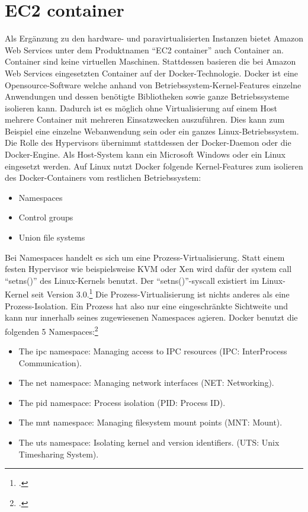 \documentclass[titlepage]{report}
\begin{document}
\section*{EC2 container}
Als Ergänzung zu den hardware\hyp{} und paravirtualisierten Instanzen
bietet Amazon Web Services unter dem Produktnamen ``EC2 container'' auch
Container an. Container sind keine virtuellen Maschinen. Stattdessen
basieren die bei Amazon Web Services eingesetzten Container auf der
Docker\hyp{}Technologie. Docker ist eine Opensource\hyp{}Software welche
anhand von Betriebssystem\hyp{}Kernel\hyp{}Features einzelne Anwendungen
und dessen benötigte Bibliotheken sowie ganze Betriebssysteme isolieren
kann. Dadurch ist es möglich ohne Virtualisierung auf einem Host mehrere
Container mit mehreren Einsatzwecken auszuführen. Dies kann zum Beispiel
eine einzelne Webanwendung sein oder ein ganzes Linux-Betriebssystem.
Die Rolle des Hypervisors übernimmt stattdessen der Docker\hyp{}Daemon oder
die Docker\hyp{}Engine. Als Host\hyp{}System kann ein Microsoft Windows
oder ein Linux eingesetzt werden. Auf Linux nutzt Docker folgende
Kernel\hyp{}Features zum isolieren des Docker\hyp{}Containers vom
restlichen Betriebssystem:
\begin{itemize}
    \item Namespaces
    \item Control groups
    \item Union file systems
\end{itemize}
Bei Namespaces handelt es sich um eine Prozess\hyp{}Virtualisierung.
Statt einem festen Hypervisor wie beispielsweise KVM oder Xen wird dafür
der system call ``setns()'' des Linux\hyp{}Kernels benutzt. Der
``setns()''\hyp{}syscall existiert im Linux\hyp{}Kernel seit Version
3.0.\footcite{setns} Die Prozess\hyp{}Virtualisierung ist nichts anderes als
eine Prozess\hyp{}Isolation. Ein Prozess hat also nur eine eingeschränkte
Sichtweite und kann nur innerhalb seines zugewiesenen Namespaces
agieren. Docker benutzt die folgenden 5 Namespaces:\footcite{docker}
\begin{itemize}
    \item The ipc namespace: Managing access to IPC resources (IPC: InterProcess Communication).
    \item The net namespace: Managing network interfaces (NET: Networking).
    \item The pid namespace: Process isolation (PID: Process ID).
    \item The mnt namespace: Managing filesystem mount points (MNT: Mount).
    \item The uts namespace: Isolating kernel and version identifiers. (UTS: Unix Timesharing System).
\end{itemize}
\end{document}
